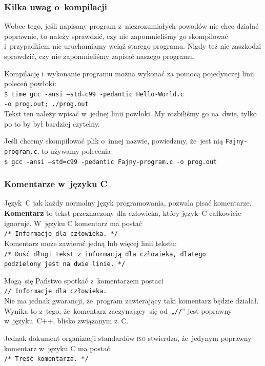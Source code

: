 \documentclass[10pt,t]{beamer}
\begin{document}
\begin{frame}
  \frametitle{Kilka uwag o~kompilacji}


  Wobec tego, jeśli napisany program z~niezrozumiałych powodów nie chce
  działać poprawnie, to należy sprawdzić, czy nie zapomnieliśmy go
  skompilować i~przypadkiem nie uruchamiamy wciąż starego programu.
  Nigdy też nie zaszkodzi sprawdzić, czy nie zapomnieliśmy zapisać naszego
  programu.

  Kompilację i~wykonanie programu można wykonać za pomocą pojedynczej linii
  poleceń powłoki: \\
  \texttt{\$ time gcc -ansi --std=c99 -pedantic Hello-World.c} \\
  \hphantom{aa} \texttt{-o prog.out; ./prog.out} \\
  Tekst ten należy wpisać w~\alert{jednej} linii powłoki. My rozbiliśmy go
  na~dwie, tylko po to by był bardziej czytelny.

  Jeśli chcemy skompilować plik o~innej nazwie, powiedzmy, że~jest nią
  \texttt{Fajny-program.c}, to używamy polecenia \\
  \texttt{\$ gcc -ansi --std=c99 -pedantic Fajny-program.c -o prog.out}

\end{frame}





\begin{frame}
  \frametitle{Komentarze w~języku C}


  Język~C jak każdy normalny język programowania, pozwala pisać komentarze.
  \textbf{Komentarz} to tekst przeznaczony dla człowieka, który język~C
  całkowicie ignoruje. W~języku C komentarz ma postać \\
  \texttt{/* Informacje dla człowieka. */} \\
  Komentarz może zawierać jedną lub więcej linii tekstu: \\
  \texttt{/* Dość długi tekst z informacją dla człowieka, dlatego} \\
  \hphantom{aa} \hspace{0.01em} \texttt{podzielony jest na dwie linie. */}

  Mogą~się Państwo spotkać z~komentarzem postaci \\
  \texttt{// Informacje dla człowieka.} \\
  Nie ma jednak gwarancji, że~program zawierający taki komentarz będzie
  działał. Wynika to z~tego, że~komentarz zaczynający~się od~„\texttt{//}”
  jest poprawny w~języku~C++, blisko związanym z~C.

  Jednak dokument organizacji standardów \textsc{iso} stwierdza,
  że~jedynym poprawny komentarz w~języku C ma postać \\
  \texttt{/* Treść komentarza. */}

\end{frame}
\end{document}
